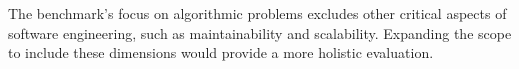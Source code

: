The benchmark’s focus on algorithmic problems excludes other critical aspects of software engineering, such as maintainability and scalability. Expanding the scope to include these dimensions would provide a more holistic evaluation.






























